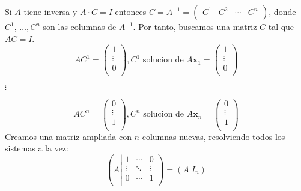 Si \(A \) tiene inversa y \(A \cdot C = I \) entonces \(C = A^{-1} = \left (\begin{array}{c|c|c|c}
		C^{1} & C^{2} & \cdots & C^{n } \\
	\end{array} \right )\), donde \(C^{1} \), \(\ldots, C^{n } \) son las columnas de \(A^{-1} \). Por tanto, buscamos una matriz \(C \) tal que \(AC = I \).
\[
	AC^{1} = \begin{pmatrix}
		1      \\
		\vdots \\
		0      \\
	\end{pmatrix}, C^{1}  \text{ solucion de }A \mathbf{x}_1 = \begin{pmatrix}
		1      \\
		\vdots \\
		0      \\
	\end{pmatrix}
\]
\begin{center}
	\(
	\vdots
	\)
\end{center}
\[
	AC^{n} = \begin{pmatrix}
		0      \\
		\vdots \\
		1      \\
	\end{pmatrix}, C^{n}  \text{ solucion de }A \mathbf{x}_n = \begin{pmatrix}
		0      \\
		\vdots \\
		1      \\
	\end{pmatrix}
\]
Creamos una matriz ampliada con \(n \) columnas nuevas, resolviendo todos los sistemas a la vez:
\[
	\left (A \left | \begin{matrix}
			1      & \cdots & 0      \\
			\vdots & \ddots & \vdots \\
			0      & \cdots & 1      \\
		\end{matrix}\right . \right ) = \left ( A \left | I_n \right . \right)
\]

